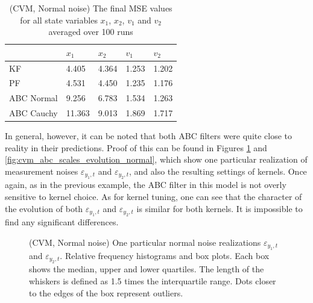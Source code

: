 \begin{table}[h!]
\centering
\begin{tabular}{ |p{2cm}|p{2cm}|p{2cm}|p{2cm}|p{2cm}|}
 \hline 
  & $x_1$ & $x_2$ & $v_1$ & $v_2$ \\
 \hline \hline
 KF & 4.405 & 4.364 & 1.253 & 1.202  \\
 PF & 4.531 & 4.450 & 1.235 & 1.176 \\
 ABC Normal & 9.256 & 6.783 & 1.534 & 1.263 \\
 ABC Cauchy & 11.363 & 9.013 & 1.869 & 1.717 \\
 \hline
\end{tabular}
\caption{(CVM, Normal noise) The final MSE values for all state variables $x_1$, $x_2$, $v_1$ and $v_2$ averaged over 100 runs}
\label{table:cvm_mse_normal}
\end{table}

In general, however, it can be noted that both ABC filters were quite close to reality in their predictions. Proof of this can be found in Figures \ref{fig:cvm_measurement_noise_normal} and \ref{fig:cvm_abc_scales_evolution_normal}, which show one particular realization of measurement noises \(\varepsilon_{y_1,t}\) and \(\varepsilon_{y_2,t}\), and also the resulting settings of kernels. Once again, as in the previous example, the ABC filter in this model is not overly sensitive to kernel choice. As for kernel tuning, one can see that the character of the evolution of both \(\varepsilon_{y_1,t}\) and \(\varepsilon_{y_2,t}\) is similar for both kernels. It is impossible to find any significant differences.

\begin{figure}[!ht]
\centering
\caption{(CVM, Normal noise) One particular normal noise realizations \(\varepsilon_{y_1,t}\) and \(\varepsilon_{y_2,t}\). Relative frequency histograms and box plots. Each box shows the median, upper and lower quartiles. The length of the whiskers is defined as 1.5 times the interquartile range. Dots closer to the edges of the box represent outliers.}
\label{fig:cvm_measurement_noise_normal}
\end{figure}

